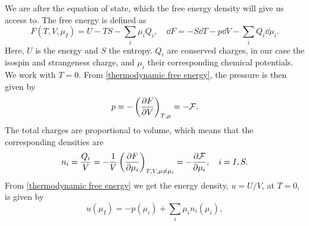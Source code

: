 We are after the equation of state, which the free energy density will give us access to.
The free energy is defined as
%
\begin{equation}
    \label{thermodynamic free energy}
    F(T, V, \mu_I) = U - TS - {\sum}_i \mu_i Q_i, 
    \quad \dd 
    F = - S \dd T - p \dd V - {\sum}_i Q_i \dd \mu_i.
\end{equation}
%
Here, $U$ is the energy and $S$ the entropy.
$Q_i$ are conserved charges, in our case the isospin and strangeness charge, and $\mu_i$ their corresponding chemical potentials.
We work with $T = 0$.
From \autoref{thermodynamic free energy}, the pressure is then given by
%
\begin{equation}
    \label{pressure form free energy}
    p = - \left(\pdv{F}{V}\right)_{T, \mu} = - \mathcal{F}.
\end{equation}
%
The total charges are proportional to volume, which means that the corresponding densities are
%
\begin{equation}
    n_i = \frac{Q_i}{V} = - \frac{1}{V} \left(\pdv{F}{\mu_i}\right)_{T, V,\mu\neq\mu_i}
    = - \pdv{\mathcal{F}}{\mu_i}, \quad i = I, S.
\end{equation}
%
From \autoref{thermodynamic free energy} we get the energy density, $u = U/V$, at $T = 0$, is given by
%
\begin{equation}
    \label{energy density form pressure and isospin}
    u(\mu_I) = -p(\mu_i) + {\sum }_i\mu_i n_i(\mu_i),
\end{equation}


